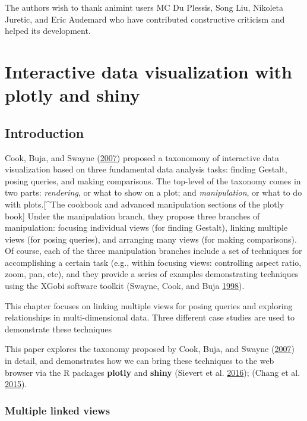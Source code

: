 \documentclass[12pt,]{isuthesis}
\begin{document}
The authors wish to thank animint users MC Du Plessis, Song Liu,
Nikoleta Juretic, and Eric Audemard who have contributed constructive
criticism and helped its development.

\chapter{Interactive data visualization with plotly and shiny}

\section{Introduction}\label{introduction-1}

Cook, Buja, and Swayne (\protect\hyperlink{ref-Cook:2007uk}{2007})
proposed a taxonomony of interactive data visualization based on three
fundamental data analysis tasks: finding Gestalt, posing queries, and
making comparisons. The top-level of the taxonomy comes in two parts:
\emph{rendering}, or what to show on a plot; and \emph{manipulation}, or
what to do with plots.{[}\^{}The cookbook and advanced manipulation
sections of the plotly book{]} Under the manipulation branch, they
propose three branches of manipulation: focusing individual views (for
finding Gestalt), linking multiple views (for posing queries), and
arranging many views (for making comparisons). Of course, each of the
three manipulation branches include a set of techniques for
accomplishing a certain task (e.g., within focusing views: controlling
aspect ratio, zoom, pan, etc), and they provide a series of examples
demonstrating techniques using the XGobi software toolkit (Swayne, Cook,
and Buja \protect\hyperlink{ref-xgobi}{1998}).

This chapter focuses on linking multiple views for posing queries and
exploring relationships in multi-dimensional data. Three different case
studies are used to demonstrate these techniques

This paper explores the taxonomy proposed by Cook, Buja, and Swayne
(\protect\hyperlink{ref-Cook:2007uk}{2007}) in detail, and demonstrates
how we can bring these techniques to the web browser via the R packages
\textbf{plotly} and \textbf{shiny} (Sievert et al.
\protect\hyperlink{ref-plotly}{2016}); (Chang et al.
\protect\hyperlink{ref-shiny}{2015}).

\hypertarget{multiple-linked-views}{\subsection{Multiple linked
views}\label{multiple-linked-views}}
\end{document}
